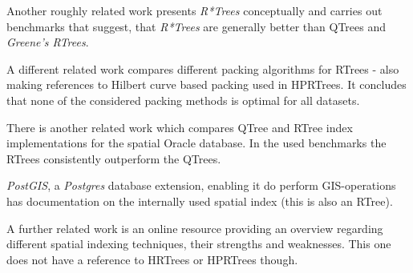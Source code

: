 Another roughly related work\cite{Beckmann1990} presents \textit{R*Trees} conceptually and carries out benchmarks that suggest, that \textit{R*Trees} are generally better than \acsp{QTree} and \textit{Greene's \acsp{RTree}}.

A different related work\cite{str1997} compares different packing algorithms for \acsp{RTree} - also making references to Hilbert curve based packing used in \acsp{HPRTree}. It concludes that none of the considered packing methods is optimal for all datasets.

There is another related work\cite{indexoracle} which compares \acs{QTree} and \acs{RTree} index implementations for the spatial Oracle database. In the used benchmarks the \acsp{RTree} consistently outperform the \acsp{QTree}.

\textit{PostGIS}, a \textit{Postgres} database extension, enabling  it do perform \acs{GIS}-operations has documentation\cite{pgisindex} on the internally used spatial index (this is also an \acs{RTree}).

A further related work\cite{mapscaping} is an online resource providing an overview regarding different spatial indexing techniques, their strengths and weaknesses. This one does not have a reference to \acsp{HRTree} or \acsp{HPRTree} though.